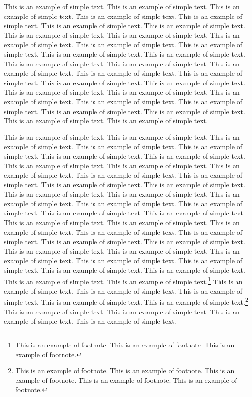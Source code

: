 \documentclass[11pt]{now}
\begin{document}
   This is an example of simple text. This is an example of simple
text.  This is an example of simple text. This is an example of
simple text.  This is an example of simple text. This is an example
of simple text.  This is an example of simple text. This is an
example of simple text.  This is an example of simple text. This is
an example of simple text.  This is an example of simple text. This
is an example of simple text.  This is an example of simple text.
This is an example of simple text.  This is an example of simple
text. This is an example of simple text.  This is an example of
simple text. This is an example of simple text.  This is an example
of simple text. This is an example of simple text.  This is an
example of simple text. This is an example of simple text.  This is
an example of simple text. This is an example of simple text.  This
is an example of simple text. This is an example of simple text.
This is an example of simple text. This is an example of simple text.
This is an example of simple text. This is an example of simple text.

   This is an example of simple text. This is an example of simple
text.  This is an example of simple text. This is an example of
simple text.  This is an example of simple text. This is an example
of simple text.  This is an example of simple text. This is an
example of simple text.  This is an example of simple text. This is
an example of simple text.  This is an example of simple text. This
is an example of simple text.  This is an example of simple text.
This is an example of simple text.  This is an example of simple
text. This is an example of simple text.  This is an example of
simple text. This is an example of simple text.  This is an example
of simple text. This is an example of simple text.  This is an
example of simple text. This is an example of simple text.  This is
an example of simple text. This is an example of simple text.  This
is an example of simple text. This is an example of simple text.
This is an example of simple text. This is an example of simple text.
This is an example of simple text. This is an example of simple text.
This is an example of simple text. This is an example of simple text.
This is an example of simple text. This is an example of simple text.
This is an example of simple text. This is an example of simple text.
This is an example of simple text.\footnote{This is an example of
footnote.  This is an example of footnote. This is an example
of footnote.} This is an example of simple text. This is an
example of simple text.  This is an example of simple text. This is
an example of simple text.  This is an example of simple
text.\footnote{This is an example of footnote.  This is an example
of footnote. This is an example of footnote.  This is an
example of footnote. This is an example of footnote.} This is
an example of simple text. This is an example of simple text.  This
is an example of simple text. This is an example of simple text.
\end{document}
